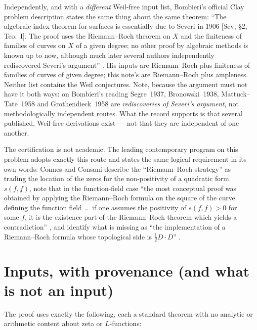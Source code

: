 \documentclass[11pt]{article}
\theoremstyle{definition}
\theoremstyle{remark}
\begin{document}
Independently, and with a \emph{different} Weil-free input list, Bombieri's official Clay
problem description states the same thing about the same theorem: ``The algebraic index theorem
for surfaces is essentially due to Severi in 1906 [Sev, \S2, Teo.~I]. The proof uses the
Riemann--Roch theorem on $X$ and the finiteness of families of curves on $X$ of a given degree;
no other proof by algebraic methods is known up to now, although much later several authors
independently rediscovered Severi's argument'' \cite[p.~9]{BombieriRH}. His inputs are
Riemann--Roch plus finiteness of families of curves of given degree; this note's are
Riemann--Roch plus ampleness. Neither list contains the Weil conjectures. Note, because the
argument must not have it both ways: on Bombieri's reading Segre~1937, Bronowski~1938,
Mattuck--Tate~1958 and Grothendieck~1958 are \emph{rediscoveries of Severi's argument}, not
methodologically independent routes. What the record supports is that several published,
Weil-free derivations exist --- not that they are independent of one another.

The certification is not academic. The leading contemporary program on this problem adopts
exactly this route and states the same logical requirement in its own words: Connes and Consani
describe the ``Riemann--Roch strategy'' as trading the location of the zeros for the
non-positivity of a quadratic form $s(f, f)$, note that in the function-field case ``the most
conceptual proof was obtained by applying the Riemann--Roch formula on the square of the curve
defining the function field \ldots\ if one assumes the positivity of $s(f, f) > 0$ for some $f$,
it is the existence part of the Riemann--Roch theorem which yields a contradiction''
\cite[\S3]{CCRR}, and identify what is missing as ``the implementation of a Riemann--Roch
formula whose topological side is $\tfrac{1}{2} D \cdot D$'' \cite[\S3.1]{CCRR}.

\section{Inputs, with provenance (and what is not an input)}
\label{sec:inputs}

The proof uses exactly the following, each a standard theorem with no analytic or arithmetic
content about zeta or $L$-functions:
\end{document}
